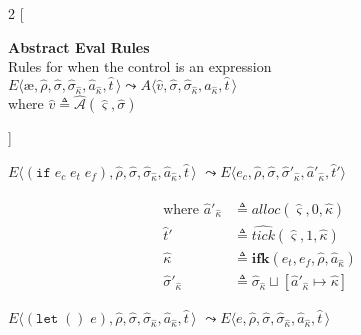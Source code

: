 \documentclass[12pt,draft]{article}
\newcommand\mae{\ensuremath{\text{\ae}}}
\newcommand{\ifsyn}[3]{(\texttt{if}\;#1\;#2\;#3)}
\begin{document}
\newpage
\footnotesize{
\begin{multicols*}{2}
[
\begin{center}
\textbf{Abstract Eval Rules} \\
Rules for when the control is an expression \\
\vspace{10mm}
  $E\langle \mae , \hat{\rho} , \hat{\sigma} , \hat{\sigma}_{\hat{\kappa}} , \hat{a}_{\hat{\kappa}} , \hat{t}\,\rangle
  \leadsto
  A\langle \hat{v} , \hat{\sigma} , \hat{\sigma}_{\hat{\kappa}} , \hat{a}_{\hat{\kappa}} , \hat{t}\,\rangle$ \\
where $\hat{v} \triangleq \hat{\mathcal{A}}(\hat{\varsigma}, \hat{\sigma})$ \\
\end{center}
]
\begin{center}
  $E\langle \ifsyn{e_c}{e_t}{e_f} , \hat{\rho} , \hat{\sigma} , \hat{\sigma}_{\hat{\kappa}} , \hat{a}_{\hat{\kappa}} , \hat{t}\,\rangle$
  $\leadsto E\langle e_c , \hat{\rho} , \hat{\sigma} , \hat{\sigma}'_{\hat{\kappa}} , \hat{a}'_{\hat{\kappa}} , \hat{t}'\rangle$
\end{center}
\vspace{-6mm}
\begin{align*}
  \text{where } \hat{a}'_{\hat{\kappa}} &\triangleq \widehat{alloc}(\hat{\varsigma}, 0, \hat{\kappa}) \\
  \hat{t}' &\triangleq \widehat{tick}(\hat{\varsigma}, 1, \hat{\kappa}) \\
  \hat{\kappa} &\triangleq \textbf{ifk}(e_t, e_f, \hat{\rho}, \hat{a}_{\hat{\kappa}}) \\
  \hat{\sigma}'_{\hat{\kappa}} &\triangleq \hat{\sigma}_{\hat{\kappa}} \sqcup [\hat{a}'_{\hat{\kappa}} \mapsto \hat{\kappa}]
\end{align*}
\begin{center}
  $E\langle (\texttt{let}\;()\;e) , \hat{\rho} , \hat{\sigma} , \hat{\sigma}_{\hat{\kappa}} , \hat{a}_{\hat{\kappa}} , \hat{t}\,\rangle$
  $\leadsto E\langle e , \hat{\rho} , \hat{\sigma} , \hat{\sigma}_{\hat{\kappa}} , \hat{a}_{\hat{\kappa}} , \hat{t}\,\rangle$

\end{center}
\end{multicols*}}
\end{document}
